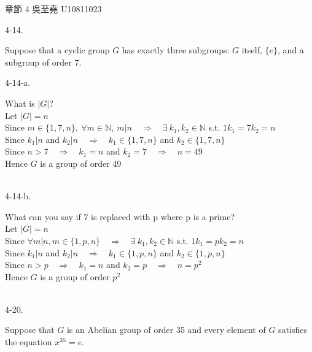 \documentclass[12pt]{book}
\author{andersonwu2000}
\begin{document}
\begin{CJK}{UTF8}{bsmi}

\hfill 章節 4 吳至堯 U10811023

4-14. \begin{minipage}[t]{\dimexpr\linewidth-2em}
Suppose that a cyclic group $G$ has exactly three subgroups: $G$ itself, $\{e\}$, and a subgroup of order 7.
\end{minipage}

4-14-a. \begin{minipage}[t]{\dimexpr\linewidth-2em}
What is $|G|$? \\
Let $|G|=n$ \\
Since $m\in\{1, 7, n\},\ \forall m\in\mathbb{N},\  m|n\quad\Rightarrow\quad\exists\ k_1, k_2\in\mathbb{N}$ s.t. $1k_1=7k_2=n$ \\
Since $k_1|n$ and $k_2|n\quad\Rightarrow\quad k_1\in\{1, 7, n\}$ and $k_2\in\{1, 7, n\}$ \\
Since $n>7\quad\Rightarrow\quad k_1=n$ and $k_2=7\quad\Rightarrow\quad n=49$ \\
Hence $G$ is a group of order 49
\end{minipage}\\

4-14-b. \begin{minipage}[t]{\dimexpr\linewidth-2em}
What can you say if 7 is replaced with p where p is a prime? \\
Let $|G|=n$ \\
Since $\forall m|n, m\in\{1, p, n\}\quad\Rightarrow\quad\exists\ k_1, k_2\in\mathbb{N}$ s.t. $1k_1=pk_2=n$ \\
Since $k_1|n$ and $k_2|n\quad\Rightarrow\quad k_1\in\{1, p, n\}$ and $k_2\in\{1, p, n\}$ \\
Since $n>p\quad\Rightarrow\quad k_1=n$ and $k_2=p\quad\Rightarrow\quad n=p^2$ \\
Hence $G$ is a group of order $p^2$
\end{minipage}\\

4-20. \begin{minipage}[t]{\dimexpr\linewidth-2em}
Suppose that $G$ is an Abelian group of order 35 and every element of $G$ satisfies the equation $x^{35}=e$.
\end{minipage}


\end{CJK}
\end{document}
